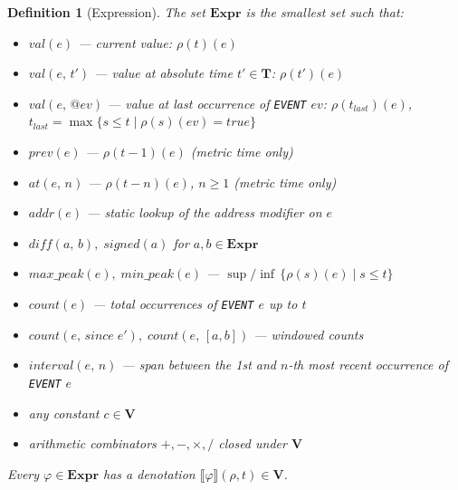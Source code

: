 \documentclass{article}
\newtheorem{definition}{Definition}
\begin{document}
\begin{definition}[Expression]
    The set $\mathbf{Expr}$ is the smallest set such that:
    \begin{itemize}
        \item $\mathit{val}(e)$ — current value: $\rho(t)(e)$
        \item $\mathit{val}(e,\, t')$ — value at absolute time $t' \in \mathbf{T}$: $\rho(t')(e)$
        \item $\mathit{val}(e,\, @\mathit{ev})$ — value at last occurrence of \texttt{EVENT} $\mathit{ev}$: $\rho(t_{\mathit{last}})(e)$,\; $t_{\mathit{last}} = \max\{s \leq t \mid \rho(s)(\mathit{ev}) = \mathit{true}\}$
        \item $\mathit{prev}(e)$ — $\rho(t-1)(e)$ \quad (metric time only)
        \item $\mathit{at}(e,\, n)$ — $\rho(t-n)(e)$,\; $n \geq 1$ \quad (metric time only)
        \item $\mathit{addr}(e)$ — static lookup of the address modifier on $e$
        \item $\mathit{diff}(a,\, b),\; \mathit{signed}(a)$ \quad for $a, b \in \mathbf{Expr}$
        \item $\mathit{max\_peak}(e),\; \mathit{min\_peak}(e)$ — $\sup / \inf\,\{\rho(s)(e) \mid s \leq t\}$
        \item $\mathit{count}(e)$ — total occurrences of \texttt{EVENT} $e$ up to $t$
        \item $\mathit{count}(e,\, \mathit{since}\; e'),\; \mathit{count}(e,\, [a,b])$ — windowed counts
        \item $\mathit{interval}(e,\, n)$ — span between the 1st and $n$-th most recent occurrence of \texttt{EVENT} $e$
        \item any constant $c \in \mathbf{V}$
        \item arithmetic combinators $+, -, \times, /$ closed under $\mathbf{V}$
    \end{itemize}
    Every $\varphi \in \mathbf{Expr}$ has a denotation $\llbracket\varphi\rrbracket(\rho, t) \in \mathbf{V}$.
\end{definition}
\end{document}
